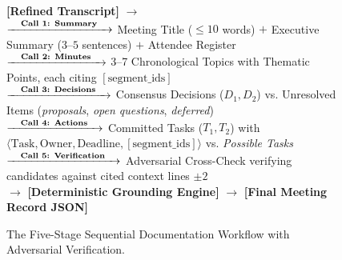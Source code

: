 \documentclass[10pt,a4paper]{article}
\begin{document}
\begin{figure}[t]
\centering
\begin{calloutbox}[title=Decomposed Five-Stage Documentation Architecture]
\small
\textbf{[Refined Transcript]} $\longrightarrow$ \\
\quad $\xrightarrow{\quad\text{\textbf{Call 1: Summary}}\quad}$ Meeting Title ($\le 10$ words) $+$ Executive Summary ($3\text{--}5$ sentences) $+$ Attendee Register \\
\quad $\xrightarrow{\quad\text{\textbf{Call 2: Minutes}}\quad}$ 3--7 Chronological Topics with Thematic Points, each citing $[\text{segment\_ids}]$ \\
\quad $\xrightarrow{\quad\text{\textbf{Call 3: Decisions}}\quad}$ Consensus Decisions ($D_1, D_2$) vs. Unresolved Items (\textit{proposals}, \textit{open questions}, \textit{deferred}) \\
\quad $\xrightarrow{\quad\text{\textbf{Call 4: Actions}}\quad}$ Committed Tasks ($T_1, T_2$) with $\langle \text{Task}, \text{Owner}, \text{Deadline}, [\text{segment\_ids}] \rangle$ vs. \textit{Possible Tasks} \\
\quad $\xrightarrow{\quad\text{\textbf{Call 5: Verification}}\quad}$ Adversarial Cross-Check verifying candidates against cited context lines $\pm 2$ \\
$\longrightarrow$ \textbf{[Deterministic Grounding Engine]} $\longrightarrow$ \textbf{[Final Meeting Record JSON]}
\end{calloutbox}
\caption{The Five-Stage Sequential Documentation Workflow with Adversarial Verification.}
\label{fig:doc_pipeline}
\end{figure}
\end{document}
